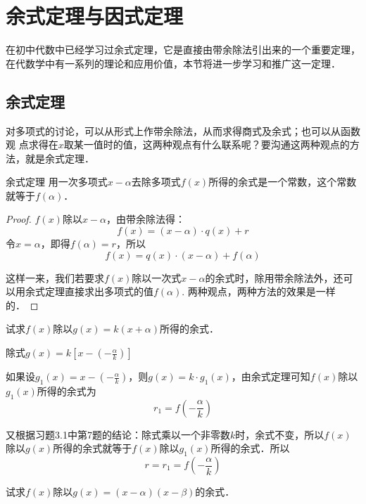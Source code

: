 \section{余式定理与因式定理}
在初中代数中已经学习过余式定理，它是直接由带余除法引出来的一个重要定理，在代数学中有一系列的理论和应用价值，本节将进一步学习和推广这一定理．

\subsection{余式定理}

对多项式的讨论，可以从形式上作带余除法，从而求得商式及余式；也可以从函数观 点求得在$x$取某一值时的值，这两种观点有什么联系呢？要沟通这两种观点的方法，就是余式定理．

\begin{blk}{余式定理}
    用一次多项式$x-\alpha$去除多项式$f(x)$所得的余式是一个常数，这个常数就等于$f(\alpha)$．
\end{blk}

\begin{proof}
    $f(x)$除以$x-\alpha$，由带余除法得：
\[f(x)=(x-\alpha)\cdot q(x)+r\]
令$x=\alpha$，即得$f(\alpha)=r$，所以
\[f(x)=q(x)\cdot (x-\alpha)+f(\alpha)\]

这样一来，我们若要求$f(x)$除以一次式$x-\alpha$的余式时，除用带余除法外，还可以用余式定理直接求出多项式的值$f(\alpha)$. 两种观点，两种方法的效果是一样的．
\end{proof}

\begin{example}
    试求$f(x)$除以$g(x)=k(x+\alpha)$所得的余式．
\end{example}

\begin{solution}
除式$g(x)=k\left[x-\left(-\frac{\alpha}{k}\right)\right]$

如果设$g_1(x)=x-\left(-\frac{\alpha}{k}\right)$，则$g(x)=k\cdot g_1(x)$，由余式定理可知$f(x)$除以$g_1(x)$所得的余式为
\[r_1=f\left(-\frac{\alpha}{k}\right)\]
    
又根据习题3.1中第7题的结论：除式乘以一个非零数$k$时，余式不变，所以$f(x)$除以$g(x)$所得的余式就等于$f(x)$除以$g_1(x)$所得的余式．所以
\[r=r_1=f\left(-\frac{\alpha}{k}\right)\]
\end{solution}


\begin{example}
    试求$f(x)$除以$g(x)=(x-\alpha)(x-\beta)$的余式．
\end{example}

